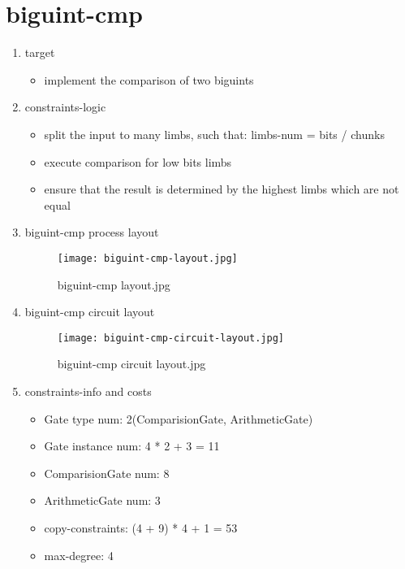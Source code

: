 \section{biguint-cmp}
\label{biguint-cmp}

\begin{enumerate}
    \item target
        \begin{itemize}
            \item implement the comparison of two biguints
        \end{itemize}
    \item constraints-logic
        \begin{itemize}
            \item split the input to many limbs, such that: limbs-num = bits / chunks
            \item execute comparison for low bits limbs
            \item ensure that the result is determined by the highest limbs which are not equal
        \end{itemize}
    \item biguint-cmp process layout
        \begin{figure}[!ht]
            \centering
            \texttt{[image: biguint-cmp-layout.jpg]}
            \caption{biguint-cmp layout.jpg}
            \label{fig:biguint-cmp-layout.jpg}
        \end{figure}
    \item biguint-cmp circuit layout
    \begin{figure}[!ht]
        \centering
        \texttt{[image: biguint-cmp-circuit-layout.jpg]}
        \caption{biguint-cmp circuit layout.jpg}
        \label{fig:biguint-cmp-circuit-layout.jpg}
    \end{figure}
    
    \item constraints-info and costs
        \begin{itemize}
            \item Gate type num: 2(ComparisionGate, ArithmeticGate)
            \item Gate instance num: 4 * 2 + 3 = 11 
            \item ComparisionGate num: 8
            \item ArithmeticGate num: 3
            \item copy-constraints: (4 + 9) * 4 + 1 = 53 
            \item max-degree: 4
        \end{itemize}

\end{enumerate}